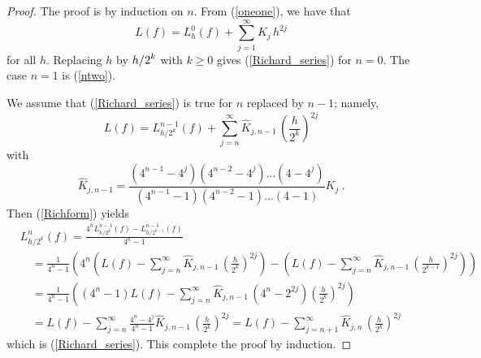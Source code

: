 \begin{proof}
The proof is by induction on $n$.  From (\ref{oneone}), we have that
\[
L(f) = L^0_h(f)+ \sum_{j=1}^\infty K_j\,h^{2j}
\]
for all $h$.  Replacing $h$ by $\displaystyle h/2^k$ with
$k\geq 0$ gives (\ref{Richard_series}) for $n=0$.  The case $n=1$ is
(\ref{ntwo}).

We assume that (\ref{Richard_series}) is true for $n$ replaced by
$n-1$; namely,
\[
L(f) = L_{h/2^k}^{n-1}(f) + \sum_{j=n}^\infty \hat{K}_{j,n-1}
\,\left(\frac{h}{2^k}\right)^{2j}
\]
with
\[
\hat{K}_{j,n-1} = 
\frac{(4^{n-1}-4^j)(4^{n-2} - 4^j) \ldots (4 - 4^j)}
{(4^{n-1}-1)(4^{n-2}-1)\ldots (4-1)} K_j \ .
\]
Then (\ref{Richform}) yields
\begin{align*}
&L_{h/2^k}^n(f) = \frac{4^n L_{h/2^k}^{n-1}(f) -
L_{h/2^{k-1}}^{n-1}(f)}{4^n -1} \\
&\quad = \frac{1}{4^n-1} \left(4^n \left(L(f) -
\sum_{j=n}^\infty \hat{K}_{j,n-1}\,\left(\frac{h}{2^k}\right)^{2j} \right)
- \left(L(f) -
\sum_{j=n}^\infty \hat{K}_{j,n-1}\,\left(\frac{h}{2^{k-1}}\right)^{2j}
\right)\right) \\
&\quad = \frac{1}{4^n-1} \left( (4^n -1)L(f) -
\sum_{j=n}^\infty \hat{K}_{j,n-1}\,\left( 4^n - 2^{2j}\right)
\left(\frac{h}{2^k}\right)^{2j} \right) \\
&\quad = L(f) - \sum_{j=n}^\infty \frac{4^n - 4^j}{4^n-1}\hat{K}_{j,n-1}
\,\left(\frac{h}{2^k}\right)^{2j}
= L(f) - \sum_{j=n+1}^\infty \hat{K}_{j,n}
\,\left(\frac{h}{2^k}\right)^{2j}
\end{align*}
which is (\ref{Richard_series}).  This complete the proof by
induction.
\end{proof}

